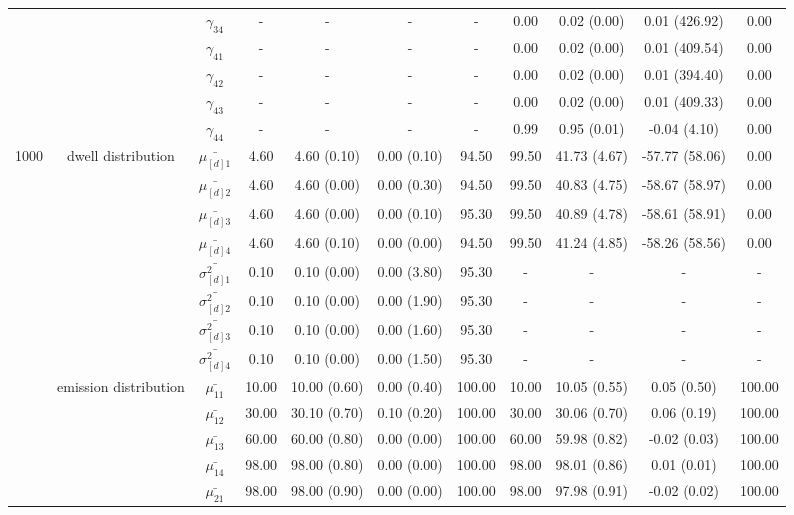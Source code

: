 \begin{table}[h]
{\begin{tabular}{ccccccccccc}
 &  & $\gamma_{34}$ & - & - & - & - & 0.00 & 0.02 (0.00) & 0.01 (426.92) & 0.00 \\
 &  & $\gamma_{41}$ & - & - & - & - & 0.00 & 0.02 (0.00) & 0.01 (409.54) & 0.00 \\
 &  & $\gamma_{42}$ & - & - & - & - & 0.00 & 0.02 (0.00) & 0.01 (394.40) & 0.00 \\
 &  & $\gamma_{43}$ & - & - & - & - & 0.00 & 0.02 (0.00) & 0.01 (409.33) & 0.00 \\
 &  & $\gamma_{44}$ & - & - & - & - & 0.99 & 0.95 (0.01) & -0.04 (4.10) & 0.00 \\ \midrule
1000 & dwell distribution & $\bar{\mu_{[d]1}}$ & 4.60 & 4.60 (0.10) & 0.00 (0.10) & 94.50 & 99.50 & 41.73 (4.67) & -57.77 (58.06) & 0.00 \\
\multirow{39}{*}{} & \multirow{7}{*}{} & $\bar{\mu_{[d]2}}$ & 4.60 & 4.60 (0.00) & 0.00 (0.30) & 94.50 & 99.50 & 40.83 (4.75) & -58.67 (58.97) & 0.00 \\
 &  & $\bar{\mu_{[d]3}}$ & 4.60 & 4.60 (0.00) & 0.00 (0.10) & 95.30 & 99.50 & 40.89 (4.78) & -58.61 (58.91) & 0.00 \\
 &  & $\bar{\mu_{[d]4}}$ & 4.60 & 4.60 (0.10) & 0.00 (0.00) & 94.50 & 99.50 & 41.24 (4.85) & -58.26 (58.56) & 0.00 \\
 &  & $\bar{\sigma^2_{[d]1}}$ & 0.10 & 0.10 (0.00) & 0.00 (3.80) & 95.30 & - & - & - & - \\
 &  & $\bar{\sigma^2_{[d]2}}$ & 0.10 & 0.10 (0.00) & 0.00 (1.90) & 95.30 & - & - & - & - \\
 &  & $\bar{\sigma^2_{[d]3}}$ & 0.10 & 0.10 (0.00) & 0.00 (1.60) & 95.30 & - & - & - & - \\
 &  & $\bar{\sigma^2_{[d]4}}$ & 0.10 & 0.10 (0.00) & 0.00 (1.50) & 95.30 & - & - & - & - \\
 & emission distribution & $\bar{\mu_{11}}$ & 10.00 & 10.00 (0.60) & 0.00 (0.40) & 100.00 & 10.00 & 10.05 (0.55) & 0.05 (0.50) & 100.00 \\
 & \multirow{15}{*}{} & $\bar{\mu_{12}}$ & 30.00 & 30.10 (0.70) & 0.10 (0.20) & 100.00 & 30.00 & 30.06 (0.70) & 0.06 (0.19) & 100.00 \\
 &  & $\bar{\mu_{13}}$ & 60.00 & 60.00 (0.80) & 0.00 (0.00) & 100.00 & 60.00 & 59.98 (0.82) & -0.02 (0.03) & 100.00 \\
 &  & $\bar{\mu_{14}}$ & 98.00 & 98.00 (0.80) & 0.00 (0.00) & 100.00 & 98.00 & 98.01 (0.86) & 0.01 (0.01) & 100.00 \\
 &  & $\bar{\mu_{21}}$ & 98.00 & 98.00 (0.90) & 0.00 (0.00) & 100.00 & 98.00 & 97.98 (0.91) & -0.02 (0.02) & 100.00 \\

\end{tabular}}
\end{table}

